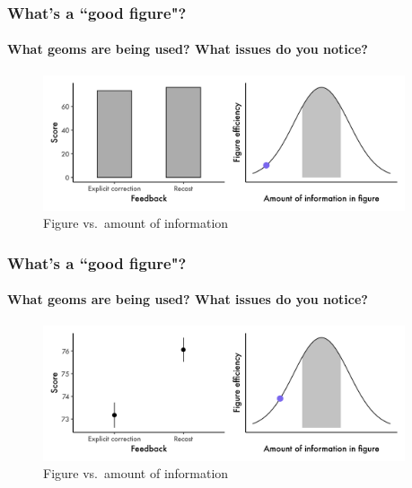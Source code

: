 \documentclass[xcolor=dvipsnames, handout, onlymath, 10pt, aspectratio=169]{beamer}
\begin{document}
\begin{frame}
	\frametitle{What's a ``good figure"?}
	\framesubtitle{What geoms are being used? What issues do you notice?}

	\begin{figure}
		\begin{center}
			\includegraphics[width=0.95\textwidth]{ex1.jpeg}
		\end{center}
		\caption{Figure vs.\ amount of information}\label{fig:f1}
	\end{figure}

\end{frame}

\begin{frame}
	\frametitle{What's a ``good figure"?}
	\framesubtitle{What geoms are being used? What issues do you notice?}

	\begin{figure}
		\begin{center}
			\includegraphics[width=0.95\textwidth]{ex2.jpeg}
		\end{center}
		\caption{Figure vs.\ amount of information}\label{fig:f2}
	\end{figure}

\end{frame}
\end{document}
